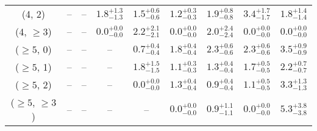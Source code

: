 \begin{table}[h!]
{\begin{tabular}{ccccccccc}
	(4, 2) & -- & -- & $1.8^{+ 1.3 }_{- 1.3 }$ & $1.5^{+ 0.6 }_{- 0.6 }$ & $1.2^{+ 0.3 }_{- 0.3 }$ & $1.9^{+ 0.8 }_{- 0.8 }$ & $3.4^{+ 1.7 }_{- 1.7 }$ & $1.8^{+ 1.4 }_{- 1.4 }$ \\[0.5ex] 
	(4, $\ge3$) & -- & -- & $0.0^{+ 0.0 }_{- 0.0 }$ & $2.2^{+ 2.1 }_{- 2.1 }$ & $0.0^{+ 0.0 }_{- 0.0 }$ & $2.0^{+ 2.4 }_{- 2.4 }$ & $0.0^{+ 0.0 }_{- 0.0 }$ & $0.0^{+ 0.0 }_{- 0.0 }$ \\[0.5ex] 
	($\ge5$, 0) & -- & -- & -- & $0.7^{+ 0.4 }_{- 0.4 }$ & $1.8^{+ 0.4 }_{- 0.4 }$ & $2.3^{+ 0.6 }_{- 0.6 }$ & $2.3^{+ 0.6 }_{- 0.6 }$ & $3.5^{+ 0.9 }_{- 0.9 }$ \\[0.5ex] 
	($\ge5$, 1) & -- & -- & -- & $1.8^{+ 1.5 }_{- 1.5 }$ & $1.1^{+ 0.3 }_{- 0.3 }$ & $1.3^{+ 0.4 }_{- 0.4 }$ & $1.7^{+ 0.5 }_{- 0.5 }$ & $2.2^{+ 0.7 }_{- 0.7 }$ \\[0.5ex] 
	($\ge5$, 2) & -- & -- & -- & $0.0^{+ 0.0 }_{- 0.0 }$ & $1.3^{+ 0.4 }_{- 0.4 }$ & $0.9^{+ 0.4 }_{- 0.4 }$ & $1.1^{+ 0.5 }_{- 0.5 }$ & $3.3^{+ 1.3 }_{- 1.3 }$ \\[0.5ex] 
	($\ge5$, $\ge3$) & -- & -- & -- & -- & $0.0^{+ 0.0 }_{- 0.0 }$ & $0.9^{+ 1.1 }_{- 1.1 }$ & $0.0^{+ 0.0 }_{- 0.0 }$ & $5.3^{+ 3.8 }_{- 3.8 }$ \\[0.5ex] 
	\hline
	\hline
\end{tabular}}
\end{table}
